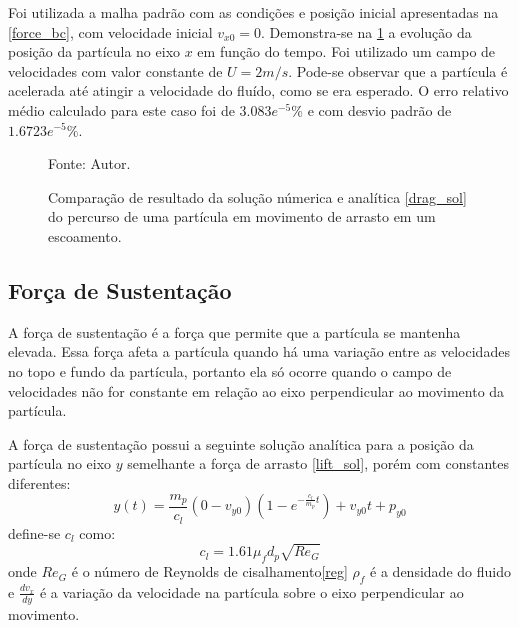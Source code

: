 Foi utilizada a malha padrão com as condições e posição inicial apresentadas na \ref{force_bc}, com velocidade inicial $v_{x0}=0$.
Demonstra-se na \ref{drag_comp} a evolução da posição da partícula no eixo $x$ em função do tempo.
Foi utilizado um campo de velocidades com valor constante de $U=2m/s$.
Pode-se observar que a partícula é acelerada até atingir a velocidade do fluído, como se era esperado.
O erro relativo médio calculado para este caso foi de $3.083e^{-5}\%$ e com desvio padrão de $1.6723e^{-5}\%$.
\begin{figure}[H]
    \centering
     {\raggedleft \scriptsize Fonte: Autor.}
    \caption{Comparação de resultado da solução númerica e analítica \ref{drag_sol} do percurso de uma partícula em movimento de arrasto em um escoamento.}
    \label{drag_comp}
\end{figure}

\subsection{\textbf{Força de Sustentação}}
\label{sec_lift}
A força de sustentação é a força que permite que a partícula se mantenha elevada.
Essa força afeta a partícula quando há uma variação entre as velocidades no topo e fundo da partícula, portanto ela só ocorre quando o campo de velocidades não for constante em relação ao eixo perpendicular ao movimento da partícula.

A força de sustentação possui a seguinte solução analítica para a posição da partícula no eixo $y$ semelhante a força de arrasto \eqref{lift_sol}, porém com constantes diferentes:
\begin{equation}
    y(t) = \dfrac{m_p}{c_l} (0 - v_{y0}) \left(1 - e^{-\frac{c_l}{m_p}t}\right) + v_{y0}t + p_{y0}
    \label{lift_sol} 
\end{equation}
define-se $c_l$ como:
\begin{equation}
    c_l = 1.61 \mu_f d_p \sqrt{{Re}_G}
    \label{lift_c} 
\end{equation}
onde $Re_G$ é o número de Reynolds de cisalhamento\eqref{reg} $\rho_f$ é a densidade do fluido e $\tfrac{dv_x}{dy}$ é a variação da velocidade na partícula sobre o eixo perpendicular ao movimento.

